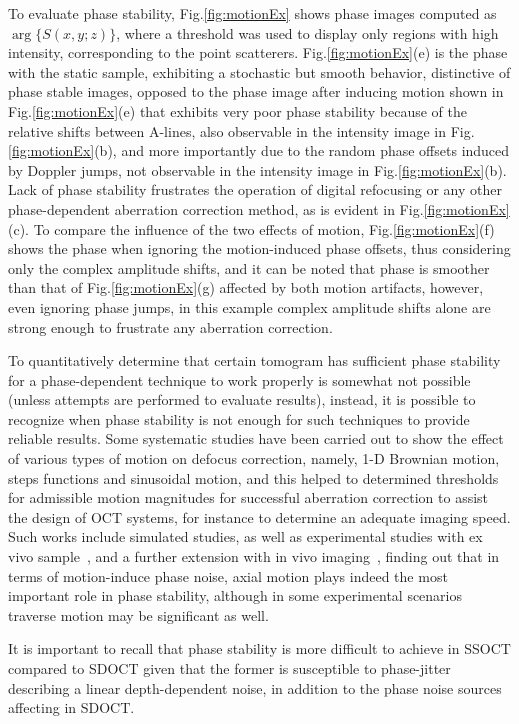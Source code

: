To evaluate phase stability, Fig.\ref{fig:motionEx} shows phase images computed as $\arg\{S(x,y;z)\}$, where a threshold was used to display only regions with high intensity, corresponding to the point scatterers. Fig.\ref{fig:motionEx}(e) is the phase with the static sample, exhibiting a stochastic but smooth behavior, distinctive of phase stable images, opposed to the phase image after inducing motion shown in Fig.\ref{fig:motionEx}(e) that exhibits very poor phase stability because of the relative shifts between A-lines, also observable in the intensity image in Fig.\ref{fig:motionEx}(b), and more importantly due to the random phase offsets induced by Doppler jumps, not observable in the intensity image in Fig.\ref{fig:motionEx}(b). Lack of phase stability frustrates the operation of digital refocusing or any other phase-dependent aberration correction method, as is evident in Fig.\ref{fig:motionEx}(c). To compare the influence of the two effects of motion, Fig.\ref{fig:motionEx}(f) shows the phase when ignoring the motion-induced phase offsets, thus considering only the complex amplitude shifts, and it can be noted that phase is smoother than that of Fig.\ref{fig:motionEx}(g) affected by both motion artifacts, however, even ignoring phase jumps, in this example complex amplitude shifts alone are strong enough to frustrate any aberration correction.

To quantitatively determine that certain tomogram has sufficient phase stability for a phase-dependent technique to work properly is somewhat not possible (unless attempts are performed to evaluate results), instead, it is possible to recognize when phase stability is not enough for such techniques to provide reliable results. Some systematic studies have been carried out to show the effect of various types of motion on defocus correction, namely, 1-D Brownian motion, steps functions and sinusoidal motion, and this helped to determined thresholds for admissible motion magnitudes for successful aberration correction to assist the design of OCT systems, for instance to determine an adequate imaging speed. Such works include simulated studies, as well as experimental studies with ex vivo sample~\cite{Shemonski2014_Stability}, and a further extension with in vivo imaging~\cite{Shemonski2014_Stability-1}, finding out that in terms of motion-induce phase noise, axial motion plays indeed the most important role in phase stability, although in some experimental scenarios traverse motion may be significant as well.

It is important to recall that phase stability is more difficult to achieve in SSOCT compared to SDOCT given that the former is susceptible to phase-jitter describing a linear depth-dependent noise, in addition to the phase noise sources affecting in SDOCT.

